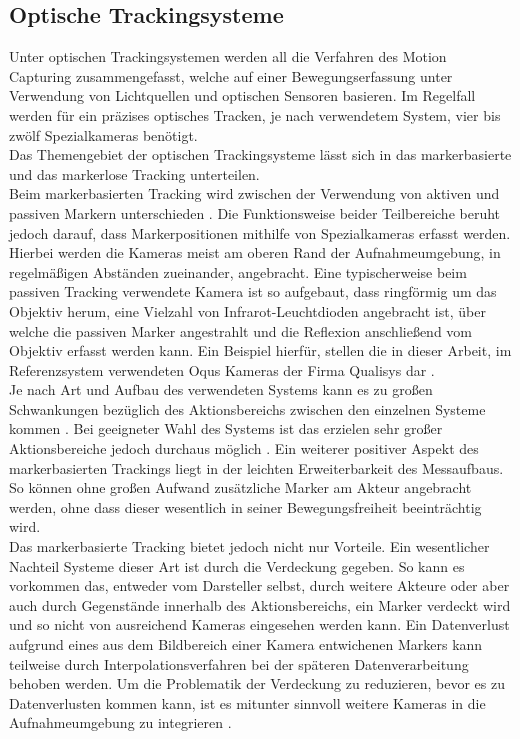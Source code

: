 \subsection{Optische Trackingsysteme}
Unter optischen Trackingsystemen werden all die Verfahren des Motion Capturing zusammengefasst, welche auf einer Bewegungserfassung unter Verwendung von Lichtquellen und optischen Sensoren basieren. \cite{P31}
Im Regelfall werden für ein präzises optisches Tracken, je nach verwendetem System, vier bis zwölf Spezialkameras benötigt.\cite{optsys1}
\\Das Themengebiet der optischen Trackingsysteme lässt sich in das markerbasierte und das markerlose Tracking unterteilen.
\\Beim markerbasierten Tracking wird zwischen der Verwendung von aktiven und passiven Markern unterschieden \cite{P25}. Die Funktionsweise beider Teilbereiche beruht jedoch darauf, dass Markerpositionen mithilfe von Spezialkameras erfasst werden. Hierbei werden die Kameras meist am oberen Rand der Aufnahmeumgebung, in regelmäßigen Abständen zueinander, angebracht.
Eine typischerweise beim passiven Tracking verwendete Kamera ist so aufgebaut, dass ringförmig um das Objektiv herum, eine Vielzahl von Infrarot-Leuchtdioden angebracht ist, über welche die passiven Marker angestrahlt und die Reflexion anschließend vom Objektiv erfasst werden kann. \cite{optsys2}
Ein Beispiel hierfür, stellen die in dieser Arbeit, im Referenzsystem verwendeten Oqus Kameras der Firma Qualisys dar \cite{oqus}.
\\Je nach Art und Aufbau des verwendeten Systems kann es zu großen Schwankungen bezüglich des Aktionsbereichs zwischen den einzelnen Systeme kommen \cite{P24}. Bei geeigneter Wahl des Systems ist das erzielen sehr großer Aktionsbereiche jedoch durchaus möglich \cite{P25}.
Ein weiterer positiver Aspekt des markerbasierten Trackings liegt in der leichten Erweiterbarkeit des Messaufbaus. So können ohne großen Aufwand zusätzliche Marker am Akteur angebracht werden, ohne dass dieser wesentlich in seiner Bewegungsfreiheit beeinträchtig wird. \cite{optsys2}
\\Das markerbasierte Tracking bietet jedoch nicht nur Vorteile. Ein wesentlicher Nachteil Systeme dieser Art ist durch die Verdeckung gegeben. So kann es vorkommen das, entweder vom Darsteller selbst, durch weitere Akteure oder aber auch durch Gegenstände innerhalb des Aktionsbereichs, ein Marker verdeckt wird und so nicht von ausreichend Kameras eingesehen werden kann. Ein Datenverlust aufgrund eines aus dem Bildbereich einer Kamera entwichenen Markers kann teilweise durch Interpolationsverfahren bei der späteren Datenverarbeitung behoben werden. \cite{optsys2} Um die Problematik der Verdeckung zu reduzieren, bevor es zu Datenverlusten kommen kann, ist es mitunter sinnvoll weitere Kameras in die Aufnahmeumgebung zu integrieren \cite{P25}.
